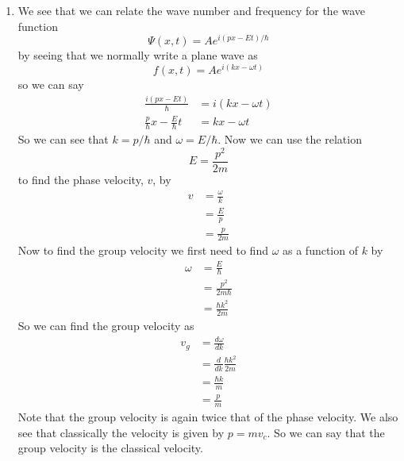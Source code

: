 \documentclass[11pt]{article}
\numberwithin{equation}{section}
\begin{document}
\begin{enumerate}
\item
We see that we can relate the wave number and frequency for the wave function
$$\Psi(x,t) = Ae^{i(px-Et)/\hbar}$$
by seeing that we normally write a plane wave as
$$f(x,t) = Ae^{i(kx-\omega t)}$$
so we can say
\begin{align*}
\frac{i(px-Et)}{\hbar} &= i(kx-\omega t)\\
\frac{p}{\hbar}x-\frac{E}{\hbar}t &= kx-\omega t
\end{align*}
So we can see that $k = p/\hbar$ and $\omega = E/\hbar$. Now we can use the relation 
$$E = \frac{p^2}{2m}$$
to find the phase velocity, $v$, by
\begin{align*}
v &= \frac{\omega}{k}\\
&= \frac{E}{p}\\
&= \frac{p}{2m}
\end{align*}
Now to find the group velocity we first need to find $\omega$ as a function of $k$ by
\begin{align*}
\omega &= \frac{E}{\hbar}\\
&= \frac{p^2}{2m\hbar}\\
&= \frac{\hbar k^2}{2m}
\end{align*}
So we can find the group velocity as
\begin{align*}
v_g &= \frac{d\omega}{dk}\\
&= \frac{d}{dk}\frac{\hbar k^2}{2m}\\
&= \frac{\hbar k}{m}\\
&= \frac{p}{m}
\end{align*}
Note that the group velocity is again twice that of the phase velocity. We also see that classically the velocity is given by $p = mv_c$. So we can say that the group velocity is the classical velocity.
\end{enumerate}
\end{document}
